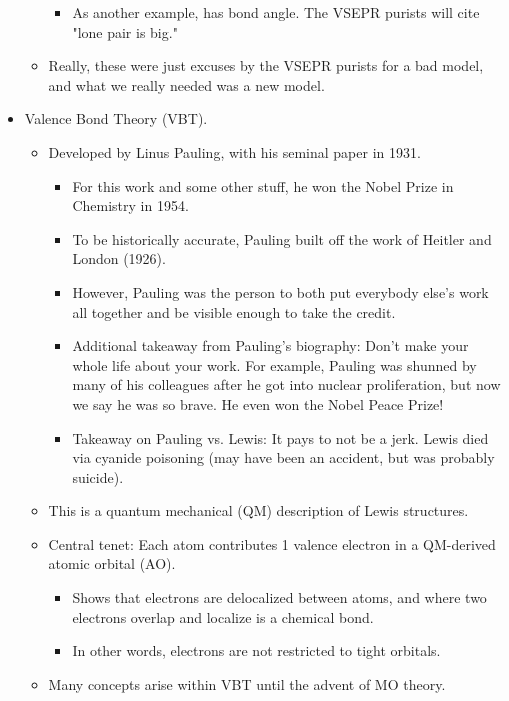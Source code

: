 \documentclass[../notes.tex]{subfiles}
\begin{document}
\begin{itemize}
\begin{itemize}
\begin{itemize}
            \item As another example,  has   bond angle. The VSEPR purists will cite "lone pair is big."
        \end{itemize}
        \item Really, these were just excuses by the VSEPR purists for a bad model, and what we really needed was a new model.
    \end{itemize}
    \item Valence Bond Theory (VBT).
    \begin{itemize}
        \item Developed by Linus Pauling, with his seminal paper in 1931.
        \begin{itemize}
            \item For this work and some other stuff, he won the Nobel Prize in Chemistry in 1954.
            \item To be historically accurate, Pauling built off the work of Heitler and London (1926).
            \item However, Pauling was the person to both put everybody else's work all together and be visible enough to take the credit.
            \item Additional takeaway from Pauling's biography: Don't make your whole life about your work. For example, Pauling was shunned by many of his colleagues after he got into nuclear proliferation, but now we say he was so brave. He even won the Nobel Peace Prize!
            \item Takeaway on Pauling vs. Lewis: It pays to not be a jerk. Lewis died via cyanide poisoning (may have been an accident, but was probably suicide).
        \end{itemize}
        \item This is a quantum mechanical (QM) description of Lewis structures.
        \item Central tenet: Each atom contributes 1 valence electron in a QM-derived atomic orbital (AO).
        \begin{itemize}
            \item Shows that electrons are delocalized between atoms, and where two electrons overlap and localize is a chemical bond.
            \item In other words, electrons are not restricted to tight orbitals.
        \end{itemize}
        \item Many concepts arise within VBT until the advent of MO theory.

\end{itemize}
\end{itemize}
\end{document}
